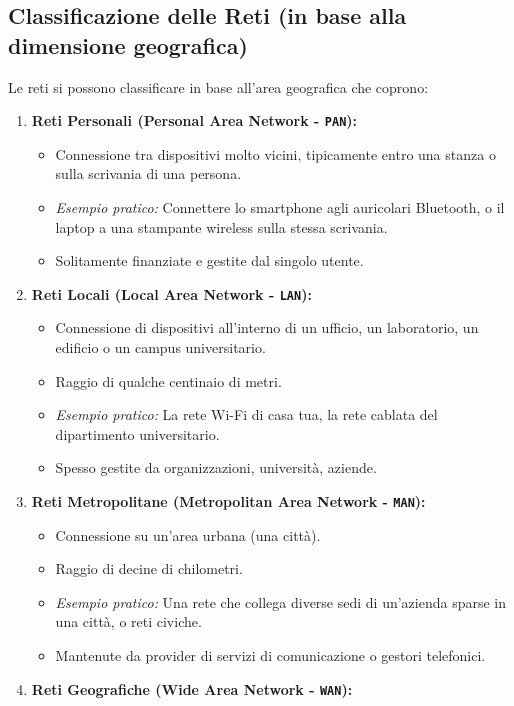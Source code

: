 \subsection{Classificazione delle Reti (in base alla dimensione geografica)}
Le reti si possono classificare in base all'area geografica che coprono:
\begin{enumerate}
    \item \textbf{Reti Personali (Personal Area Network - \texttt{PAN}):}
    \begin{itemize}
        \item Connessione tra dispositivi molto vicini, tipicamente entro una stanza o sulla scrivania di una persona.
        \item \textit{Esempio pratico:} Connettere lo smartphone agli auricolari Bluetooth, o il laptop a una stampante wireless sulla stessa scrivania.
        \item Solitamente finanziate e gestite dal singolo utente.
    \end{itemize}
    \item \textbf{Reti Locali (Local Area Network - \texttt{LAN}):}
    \begin{itemize}
        \item Connessione di dispositivi all'interno di un ufficio, un laboratorio, un edificio o un campus universitario.
        \item Raggio di qualche centinaio di metri.
        \item \textit{Esempio pratico:} La rete Wi-Fi di casa tua, la rete cablata del dipartimento universitario.
        \item Spesso gestite da organizzazioni, università, aziende.
    \end{itemize}
    \item \textbf{Reti Metropolitane (Metropolitan Area Network - \texttt{MAN}):}
    \begin{itemize}
        \item Connessione su un'area urbana (una città).
        \item Raggio di decine di chilometri.
        \item \textit{Esempio pratico:} Una rete che collega diverse sedi di un'azienda sparse in una città, o reti civiche.
        \item Mantenute da provider di servizi di comunicazione o gestori telefonici.
    \end{itemize}
    \item \textbf{Reti Geografiche (Wide Area Network - \texttt{WAN}):}

\end{enumerate}

